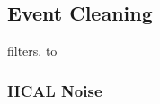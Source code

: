 \subsection{Event Cleaning \label{sec:event_cleaning}}
% 
filters.
% 
to
% 
% 

\subsubsection{HCAL Noise}\label{sec:noise}

